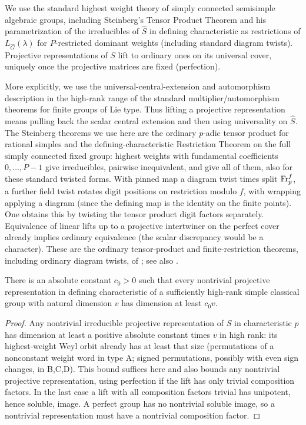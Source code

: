 We use the standard highest weight theory of simply connected semisimple algebraic groups, including Steinberg's Tensor Product Theorem and his parametrization of the irreducibles of \(\widehat S\) in defining characteristic as restrictions of \(L_{\widehat G}(\lambda)\) for \(P\)-restricted dominant weights (including standard diagram twists). Projective representations of \(S\) lift to ordinary ones on its universal cover, uniquely once the projective matrices are fixed (perfection). 

More explicitly, we use the universal-central-extension and automorphism description in the high-rank range of the standard multiplier/automorphism theorems for finite groups of Lie type. Thus lifting a projective representation means pulling back the scalar central extension and then using universality on \(\widehat S\). The Steinberg theorems we use here are the ordinary \(p\)-adic tensor product for rational simples and the defining-characteristic Restriction Theorem on the full simply connected fixed group: highest weights with fundamental coefficients \(0,\ldots,P-1\) give irreducibles, pairwise inequivalent, and give all of them, also for these standard twisted forms. With pinned map a diagram twist times split \({\rm Fr}_p^f\), a further field twist rotates digit positions on restriction modulo \(f\), with wrapping applying a diagram (since the defining map is the identity on the finite points). One obtains this by twisting the tensor product digit factors separately. Equivalence of linear lifts up to a projective intertwiner on the perfect cover already implies ordinary equivalence (the scalar discrepancy would be a character). These are the ordinary tensor-product and finite-restriction theorems, including ordinary diagram twists, of \citet[Theorems 1.1, 7.4 and 9.3]{Steinberg1963}; see also \citet{Jantzen2003}.

\begin{lemma}\label{w:min-degree}
There is an absolute constant $c_0>0$ such that every nontrivial projective representation in defining characteristic of a sufficiently high-rank simple classical group with natural dimension $v$ has dimension at least $c_0v$.
\end{lemma}
\begin{proof}
Any nontrivial irreducible projective representation of \(S\) in characteristic \(p\) has dimension at least a positive absolute constant times \(v\) in high rank: its highest-weight Weyl orbit already has at least that size (permutations of a nonconstant weight word in type A; signed permutations, possibly with even sign changes, in B,C,D). This bound suffices here and also bounds any nontrivial projective representation, using perfection if the lift has only trivial composition factors. In the last case a lift with all composition factors trivial has unipotent, hence soluble, image. A perfect group has no nontrivial soluble image, so a nontrivial representation must have a nontrivial composition factor.
\end{proof}


